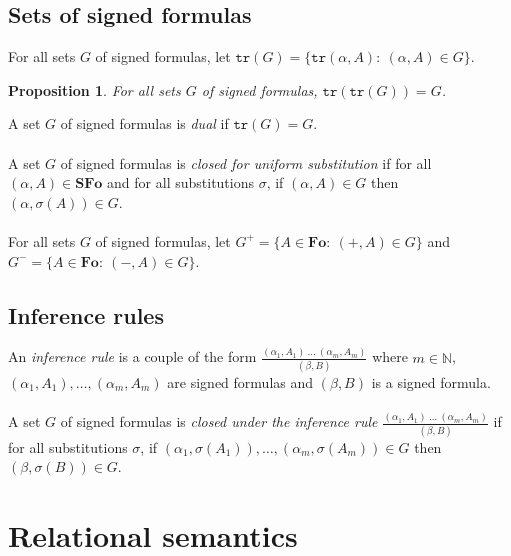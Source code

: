 \documentclass[draft]{article}
\newtheorem{proposition}{Proposition}
\def\N{\mathbb{N}}
\def\Fo{\mathbf{Fo}}
\def\SFo{\mathbf{SFo}}
\begin{document}
\subsection{Sets of signed formulas}
%
%
For all sets $G$ of signed formulas, let $\mathtt{tr}(G){=}\{\mathtt{tr}(\alpha,A):\ (\alpha,A){\in}G\}$.
%
%
\begin{proposition}\label{Proposition:for:all:sets:of:formulas:2}
%
%
For all sets $G$ of signed formulas, $\mathtt{tr}(\mathtt{tr}(G)){=}G$.
%
%
\end{proposition}
%
%
A set $G$ of signed formulas is {\em dual}\/ if $\mathtt{tr}(G){=}G$.
%
%
\\
\\
%
%
A set $G$ of signed formulas is {\em closed for uniform substitution}\/ if for all $(\alpha,A){\in}\SFo$ and for all substitutions $\sigma$, if $(\alpha,A){\in}G$ then $(\alpha,\sigma(A)){\in}G$.
%
%
\\
\\
%
%
For all sets $G$ of signed formulas, let $G^{+}{=}\{A{\in}\Fo:\ (+,A){\in}G\}$ and $G^{-}{=}\{A{\in}\Fo:\ (-,A){\in}G\}$.
%
%
%
%
\subsection{Inference rules}
%
%
An {\em inference rule}\/ is a couple of the form $\frac{(\alpha_{1},A_{1})\ \ldots\ (\alpha_{m},A_{m})}{(\beta,B)}$ where $m{\in}\N$, $(\alpha_{1},A_{1}),
%
%
%
%
%
%
%
$\linebreak$
%
%
%
%
%
%
\ldots,(\alpha_{m},A_{m})$ are signed formulas and $(\beta,B)$ is a signed formula.
%
%
\\
\\
%
%
A set $G$ of signed formulas is {\em closed under the inference rule $\frac{(\alpha_{1},A_{1})\ \ldots\ (\alpha_{m},A_{m})}{(\beta,B)}$}\/ if for all substitutions $\sigma$, if $(\alpha_{1},\sigma(A_{1})),\ldots,(\alpha_{m},\sigma(A_{m})){\in}G$ then $(\beta,\sigma(B)){\in}G$.
%
%
%
%
%
%
\section{Relational semantics}\label{section:relational:semantics}
%
%
%
%
\end{document}
